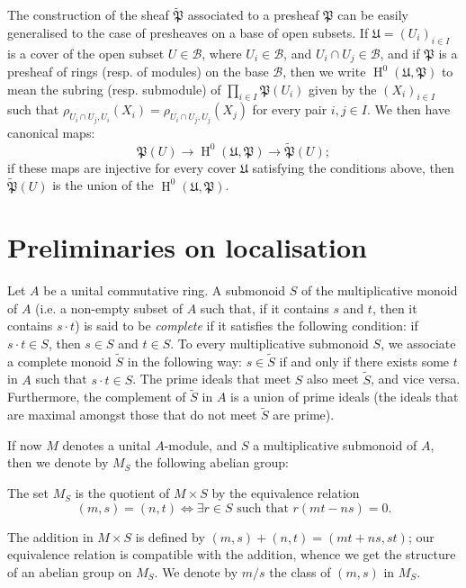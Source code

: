 \documentclass{article}
\theoremstyle{plain}
\newcommand{\sh}{\mathfrak}
\DeclareMathOperator{\HH}{H}
\newcommand{\oldpage}[1]{\marginpar{\footnotesize$\Big\vert$ \textit{p.~#1}}}
\begin{document}
The construction of the sheaf $\widetilde{\sh{P}}$ associated to a presheaf $\sh{P}$ can be easily generalised to the case of presheaves on a base of open subsets.
If $\mathfrak{U}=(U_i)_{i\in I}$ is a cover of the open subset $U\in\mathscr{B}$, where $U_i\in\mathscr{B}$, and $U_i\cap U_j\in\mathscr{B}$, and if $\sh{P}$ is a presheaf of rings (resp. of modules) on the base $\mathscr{B}$, then we write $\HH^0(\mathfrak{U},\sh{P})$ to mean the subring (resp. submodule) of $\prod_{i\in I}\sh{P}(U_i)$ given by the $(X_i)_{i\in I}$ such that $\rho_{U_i\cap U_j,U_i}(X_i) = \rho_{U_i\cap U_j,U_j}(X_j)$ for every pair $i,j\in I$.
We then have canonical maps:
\[
  \sh{P}(U) \to \HH^0(\mathfrak{U},\sh{P}) \to \widetilde{\sh{P}}(U);
\]
if these maps are injective for every cover $\mathfrak{U}$ satisfying the conditions above, then $\widetilde{\sh{P}}(U)$ is the union of the $\HH^0(\mathfrak{U},\sh{P})$.


\section{Preliminaries on localisation}
\label{section1}

Let $A$ be a unital commutative ring.
A submonoid $S$ of the multiplicative monoid of $A$ (i.e. a non-empty subset of $A$ such that, if it contains $s$ and $t$, then it contains $s\cdot t$) is said to be \emph{complete} if it satisfies the following condition:
if $s\cdot t\in S$, then $s\in S$ and $t\in S$.
To every multiplicative submonoid
\oldpage{1-02}
$S$, we associate a complete monoid $\widetilde{S}$ in the following way:
$s\in\widetilde{S}$ if and only if there exists some $t$ in $A$ such that $s\cdot t\in S$.
The prime ideals that meet $S$ also meet $\widetilde{S}$, and vice versa.
Furthermore, the complement of $\widetilde{S}$ in $A$ is a union of prime ideals (the ideals that are maximal amongst those that do not meet $\widetilde{S}$ are prime).

If now $M$ denotes a unital $A$-module, and $S$ a multiplicative submonoid of $A$, then we denote by $M_S$ the following abelian group:

The set $M_S$ is the quotient of $M\times S$ by the equivalence relation
\[
  (m,s) = (n,t) \iff \exists r\in S\mbox{ such that }r(mt-ns)=0.
\]

The addition in $M\times S$ is defined by $(m,s)+(n,t)=(mt+ns,st)$;
our equivalence relation is compatible with the addition, whence we get the structure of an abelian group on $M_S$.
We denote by $m/s$ the class of $(m,s)$ in $M_S$.
\end{document}
